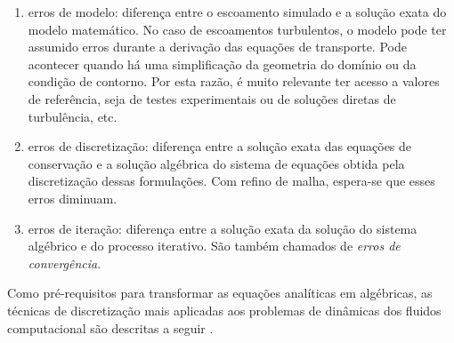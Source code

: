 \begin{enumerate}
    \begin{enumerate}
        \item erros de modelo: diferença entre o escoamento simulado e a solução exata do modelo matemático. No caso de escoamentos turbulentos, o modelo pode ter assumido erros durante a derivação das equações de transporte. Pode acontecer quando há uma simplificação da geometria do domínio ou da condição de contorno. Por esta razão, é muito relevante ter acesso a valores de referência, seja de testes experimentais ou de soluções diretas de turbulência, etc.
        \item erros de discretização: diferença entre a solução exata das equações de conservação e a solução algébrica do sistema de equações obtida pela discretização dessas formulações. Com refino de malha, espera-se que esses erros diminuam.  
        \item erros de iteração: diferença entre a solução exata da solução do sistema algébrico e do processo iterativo. São também chamados de \textit{erros de convergência}.
    \end{enumerate}
\end{enumerate}

Como pré-requisitos para transformar as equações analíticas em algébricas, as técnicas de discretização mais aplicadas aos problemas de dinâmicas dos fluidos computacional são descritas a seguir \cite{Ferziger&Peric2020}.

